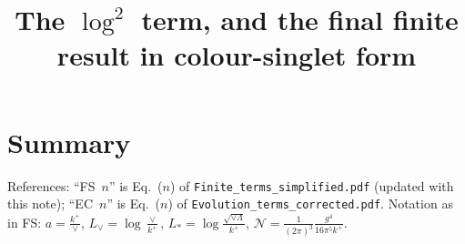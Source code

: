\documentclass[10pt]{article}
\title{The $\log^2$ term, and the final finite result in colour-singlet form}
\date{}
\numberwithin{equation}{section}
\newcommand{\Lv}{L_{\vee}}
\newcommand{\Ls}{L_{*}}
\newcommand{\NN}{\mathcal N}
\newcommand{\pre}{\frac{1}{(2\pi)^3}}
\begin{document}
\maketitle
\tableofcontents

\section{Summary}\label{sec:summary}
References: ``FS~$n$'' is Eq.~($n$) of \texttt{Finite\_terms\_simplified.pdf} (updated with this note); ``EC~$n$'' is Eq.~($n$) of \texttt{Evolution\_terms\_corrected.pdf}. Notation as in FS: $a=\frac{k^+}{\vee}$, $\Lv=\log\frac{\vee}{k^+}$, $\Ls=\log\frac{\sqrt{\vee\Lambda}}{k^+}$, $\NN=\pre\frac{g^4}{16\pi^5k^+}$.
\end{document}
